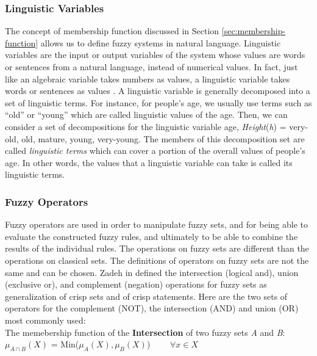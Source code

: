 \documentclass[11pt]{article}
\begin{document}
\subsubsection{Linguistic Variables}
\label{sec:linguistic-variables}

The concept of membership function discussed in Section
\ref{sec:membership-function} allows us to define fuzzy systems in natural
language. Linguistic variables are the input or output variables of the system
whose values are words or sentences from a natural language, instead of
numerical values. In fact, just like an algebraic variable takes numbers as
values, a linguistic variable takes words or sentences as values
\cite{zimmermann:fuzzy-sets}. A linguistic variable is generally decomposed into
a set of linguistic terms. For instance, for people's age, we usually use terms
such as ``old'' or ``young'' which are called linguistic values of the age.
Then, we can consider a set of decompositions for the linguistic variable age,
\textit{Height}(\textit{h}) = {very-old, old, mature, young, very-young}. The
members of this decomposition set are called \textit{linguistic terms} which can
cover a portion of the overall values of people's age. In other words, the
values that a linguistic variable can take is called its linguistic terms.

\subsubsection{Fuzzy Operators}

Fuzzy operators are used in order to manipulate fuzzy sets, and for being able
to evaluate the constructed fuzzy rules, and ultimately to be able to combine
the results of the individual rules. The operations on fuzzy sets are different
than the operations on classical sets. The definitions of operators on fuzzy
sets are not the same and can be chosen. Zadeh in \cite{zadeh:fuzzy} defined the
intersection (logical and), union (exclusive or), and complement (negation)
operations for fuzzy sets as generalization of crisp sets and of crisp
statements. Here are the two sets of operators for the complement (NOT), the
intersection (AND) and union (OR) most commonly used:\\

\noindent The memebership function of the \textbf{Intersection} of two fuzzy
sets \textit{A} and \textit{B}:\\

$\mu_{A \cap B}(X)$ = Min($\mu_{A}(X), \mu_{B}(X)$) $\qquad \forall x \in X$\\
\end{document}
